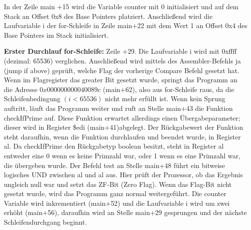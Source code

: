 \documentclass[a4paper,12pt]{article}
\begin{document}
\noindent In der Zeile main +15 wird die Variable counter mit 0 initialisiert und auf dem Stack an Offset 0x8 des Base Pointers platziert. 
Anschließend wird die Laufvariable i der for-Schleife in Zeile main+22 mit dem Wert 1 an Offset 0x4 des Base Pointers im Stack initialisiert.
\par\smallskip\noindent\textbf{Erster Durchlauf for-Schleife: } Zeile +29. Die Laufvariable i wird mit 0xffff (dezimal: 65536) verglichen. Anschließend wird mittels des Assembler-Befehls ja (jump if above) geprüft, welche Flag der vorherige Compare Befehl gesetzt hat. Wenn im Flagregister das greater Bit gesetzt wurde, springt das Programm an die Adresse $0x000000000040089c$ (main+62), also aus for-Schleife raus, da die Schleifenbedingung $(i<65536)$ nicht mehr erfüllt ist. Wenn kein Sprung auftritt, läuft das Programm weiter und ruft an Stelle main+43 die Funktion checkIfPrime auf. Diese Funktion erwartet allerdings einen Übergabeparameter; dieser wird in Register \$edi (main+41)abgelegt. 
Der Rückgabewert der Funktion steht daraufhin, wenn die Funktion durchlaufen und beendet wurde, in Register al. Da checkIfPrime den Rückgabetyp boolean besitzt, steht in Register al entweder eine 0 wenn es keine Primzahl war, oder 1 wenn es eine Primzahl war, die übergeben wurde. Der Befehl test an Stelle main+48 führt ein bitweise logisches UND zwischen al und al aus. Hier prüft der Prozessor, ob das Ergebnis ungleich null war und setzt das ZF-Bit (Zero Flag). Wenn das Flag-Bit nicht gesetzt wurde, wird das Programm ganz normal weitergeführt. Die counter Variable wird inkrementiert (main+52) und die Laufvariable i wird um zwei erhöht (main+56), daraufhin wird an Stelle main+29 gesprungen und der nächste Schleifendurchgang beginnt.
\end{document}
